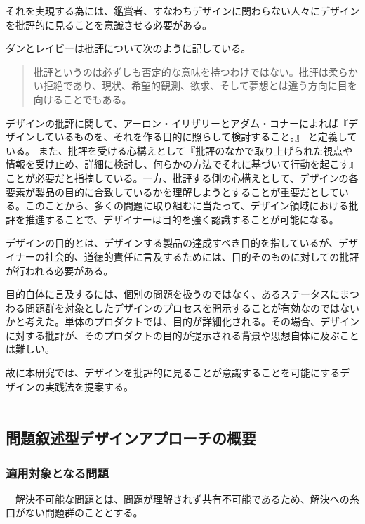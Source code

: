 \documentclass{jsarticle}
\begin{document}
それを実現する為には、鑑賞者、すなわちデザインに関わらない人々にデザインを批評的に見ることを意識させる必要がある。



ダンとレイビーは批評について次のように記している。
\begin{quotation}
批評というのは必ずしも否定的な意味を持つわけではない。批評は柔らかい拒絶であり、現状、希望的観測、欲求、そして夢想とは違う方向に目を向けることでもある。
\end{quotation}


デザインの批評に関して、アーロン・イリザリーとアダム・コナー\cite{designC}によれば『デザインしているものを、それを作る目的に照らして検討すること。』
と定義している。
また、批評を受ける心構えとして『批評のなかで取り上げられた視点や情報を受け止め、詳細に検討し、何らかの方法でそれに基づいて行動を起こす』ことが必要だと指摘している。一方、批評する側の心構えとして、デザインの各要素が製品の目的に合致しているかを理解しようとすることが重要だとしている。このことから、多くの問題に取り組むに当たって、デザイン領域における批評を推進することで、デザイナーは目的を強く認識することが可能になる。

デザインの目的とは、デザインする製品の達成すべき目的を指しているが、デザイナーの社会的、道徳的責任に言及するためには、目的そのものに対しての批評が行われる必要がある。

目的自体に言及するには、個別の問題を扱うのではなく、あるステータスにまつわる問題群を対象としたデザインのプロセスを開示することが有効なのではないかと考えた。単体のプロダクトでは、目的が詳細化される。その場合、デザインに対する批評が、そのプロダクトの目的が提示される背景や思想自体に及ぶことは難しい。







故に本研究では、デザインを批評的に見ることが意識することを可能にするデザインの実践法を提案する。
　　　　　　　　　　　　　　　　　　　　　　　　　　　　　　　　　　　　　　　　
\newpage
\subsection{問題叙述型デザインアプローチの概要}

\subsubsection{適用対象となる問題}

　解決不可能な問題とは、問題が理解されず共有不可能であるため、解決への糸口がない問題群のこととする。
\end{document}
